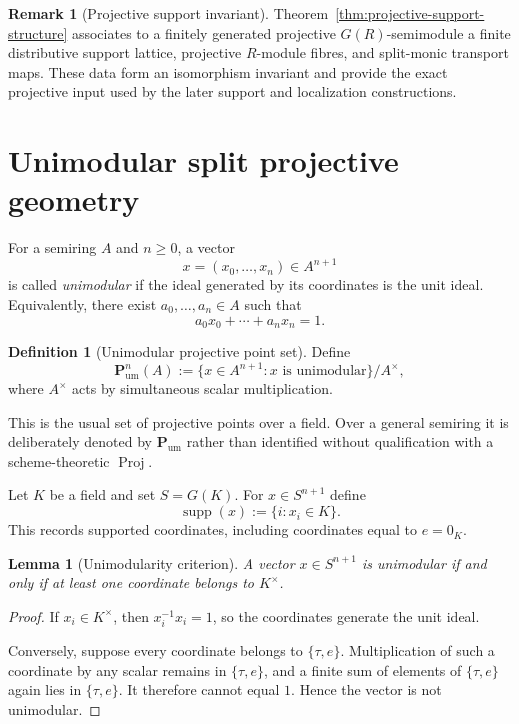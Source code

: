 \documentclass[11pt]{amsart}
\numberwithin{equation}{section}
\newtheorem{lemma}[theorem]{Lemma}
\theoremstyle{definition}
\newtheorem{definition}[theorem]{Definition}
\newtheorem{remark}[theorem]{Remark}
\newcommand{\Proj}{\operatorname{Proj}}
\newcommand{\supp}{\operatorname{supp}}
\newcommand{\Pum}{\mathbf P_{\mathrm{um}}}
\begin{document}
\begin{remark}[Projective support invariant]
\label{rem:projective-classification-boundary}
Theorem~\ref{thm:projective-support-structure} associates to a finitely
generated projective $G(R)$-semimodule a finite distributive support
lattice, projective $R$-module fibres, and split-monic transport maps.
These data form an isomorphism invariant and provide the exact projective
input used by the later support and localization constructions.
\end{remark}

\section{Unimodular split projective geometry}

For a semiring $A$ and $n\ge0$, a vector
\[
x=(x_0,\dots,x_n)\in A^{n+1}
\]
is called \emph{unimodular} if the ideal generated by its coordinates is the unit ideal.  Equivalently, there exist $a_0,\dots,a_n\in A$ such that
\[
a_0x_0+\cdots+a_nx_n=1.
\]

\begin{definition}[Unimodular projective point set]\label{def:unimodular-projective}
Define
\[
\Pum^n(A)
:=
\{x\in A^{n+1}:x\text{ is unimodular}\}/A^\times,
\]
where $A^\times$ acts by simultaneous scalar multiplication.
\end{definition}

This is the usual set of projective points over a field.  Over a general semiring it is deliberately denoted by $\Pum$ rather than identified without qualification with a scheme-theoretic $\Proj$.

Let $K$ be a field and set $S=G(K)$.  For $x\in S^{n+1}$ define
\[
\supp(x):=\{i:x_i\in K\}.
\]
This records supported coordinates, including coordinates equal to $e=0_K$.

\begin{lemma}[Unimodularity criterion]\label{lem:unimodularity-criterion}
A vector $x\in S^{n+1}$ is unimodular if and only if at least one coordinate belongs to $K^\times$.
\end{lemma}

\begin{proof}
If $x_i\in K^\times$, then $x_i^{-1}x_i=1$, so the coordinates generate the unit ideal.

Conversely, suppose every coordinate belongs to $\{\tau,e\}$.  Multiplication of such a coordinate by any scalar remains in $\{\tau,e\}$, and a finite sum of elements of $\{\tau,e\}$ again lies in $\{\tau,e\}$.  It therefore cannot equal $1$.  Hence the vector is not unimodular.
\end{proof}
\end{document}
